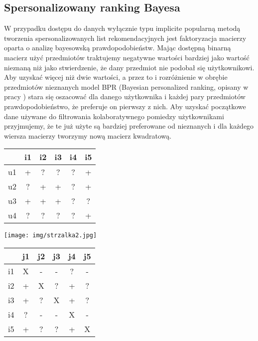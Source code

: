 \documentclass{pracamgr}
\begin{document}
   \subsection{Spersonalizowany ranking Bayesa}
    W przypadku dostępu do danych wyłącznie typu implicite popularną metodą tworzenia spersonalizowanych list rekomendacyjnych jest
    faktoryzacja macierzy oparta o analizę bayesowską prawdopodobieństw.\newline
    Mając dostępną binarną macierz użyć przedmiotów traktujemy negatywne wartości bardziej jako wartość nieznaną niż jako stwierdzenie,
    że dany przedmiot nie podobał się użytkownikowi. Aby uzyskać więcej niż dwie wartości, a przez to i rozróżnienie w obrębie przedmiotów nieznanych
    model BPR (Bayesian personalized ranking, opisany w pracy \cite{BPR}) stara się oszacować dla danego użytkownika i każdej pary przedmiotów prawdopodobieństwo,
    że preferuje on pierwszy z nich. Aby uzyskać początkowe dane używane do filtrowania kolaboratywnego pomiedzy użytkownikami
    przyjmujemy, że te już użyte są bardziej preferowane od nieznanych i dla każdego wiersza macierzy tworzymy nową macierz kwadratową.
     \begin{multicols}{3}
     \begin{tabular}{c|c|c|c|c|c|}
       & i1 & i2 & i3 & i4 & i5 \\
      \hline
      u1 & + & ? & ? & ? & + \\
      \hline
      u2 & ? & + & + & ? & + \\    
      \hline
      u3 & + & + & + & ? & ? \\
      \hline
      u4 & ? & ? & ? & ? & + \\    
     \end{tabular}
     \begin{center}
      \texttt{[image: img/strzalka2.jpg]}\newline
     \end{center}
     \begin{tabular}{c|c|c|c|c|c|}
       & j1 & j2 & j3 & j4 & j5 \\
      \hline
      i1 & X & - & - & ? & - \\
      \hline
      i2 & + & X & ? & + & ? \\    
      \hline
      i3 & + & ? & X & + & ? \\    
      \hline
      i4 & ? & - & - & X & - \\
      \hline
      i5 & + & ? & ? & + & X \\ 
     \end{tabular}
    \end{multicols}
\end{document}
